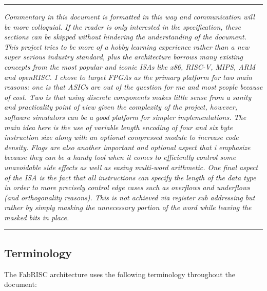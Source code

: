\documentclass{article}
\begin{document}
    \par\noindent\rule{\textwidth}{0.4pt}
    \textit{Commentary in this document is formatted in this way and communication will be more colloquial. If the reader is only interested in the specification, these sections can be skipped without hindering the understanding of the document. This project tries to be more of a hobby learning experience rather than a new super serious industry standard, plus the architecture borrows many existing concepts from the most popular and iconic ISAs like x86, RISC-V, MIPS, ARM and openRISC. I chose to target FPGAs as the primary platform for two main reasons: one is that ASICs are out of the question for me and most people because of cost. Two is that using discrete components makes little sense from a sanity and practicality point of view given the complexity of the project, however, software simulators can be a good platform for simpler implementations. The main idea here is the use of variable length encoding of four and six byte instruction size along with an optional compressed module to increase code density. Flags are also another important and optional aspect that i emphasize because they can be a handy tool when it comes to efficiently control some unavoidable side effects as well as easing multi-word arithmetic. One final aspect of the ISA is the fact that all instructions can specify the length of the data type in order to more precisely control edge cases such as overflows and underflows (and orthogonality reasons). This is not achieved via register sub addressing but rather by simply masking the unnecessary portion of the word while leaving the masked bits in place.}
    \par\noindent\rule{\textwidth}{0.4pt}

    \subsection[Terminology]{Terminology}

        The FabRISC architecture uses the following terminology throughout the document:
\end{document}
